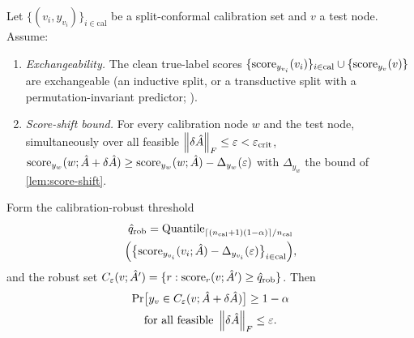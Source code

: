 \begin{theorem}
\label{thm:robust-cov}
Let $\{(v_i,y_{v_i})\}_{i\in\mathrm{cal}}$ be a split-conformal calibration set and $v$ a test node.
Assume:
\begin{enumerate}
\item[(C1)] \emph{Exchangeability.} The clean true-label scores
$\{\mathrm{score}_{y_{v_i}}(v_i)\}_{i\in\mathrm{cal}}\cup\{\mathrm{score}_{y_v}(v)\}$ are exchangeable (an inductive
split, or a transductive split with a permutation-invariant predictor; \citealp{zargarbashi2023conformal}).
\item[(C2)] \emph{Score-shift bound.} For every calibration node $w$ and the test node, simultaneously
over all feasible $\left\|\delta\hat{A}\right\|_F\le\varepsilon<\varepsilon_{\mathrm{crit}}$,
$\mathrm{score}_{y_w}(w;\hat{A}+\delta\hat{A})\ge\mathrm{score}_{y_w}(w;\hat{A})-\Delta_{y_w}(\varepsilon)$ with
$\Delta_{y_w}$ the bound of \cref{lem:score-shift}.
\end{enumerate}
Form the calibration-robust threshold
\begin{multline}
\hat q_{\mathrm{rob}}=\mathrm{Quantile}_{\lceil(n_{\mathrm{cal}}+1)(1-\alpha)\rceil/n_{\mathrm{cal}}}\\
\Big(\big\{\mathrm{score}_{y_{v_i}}(v_i;\hat{A})-\Delta_{y_{v_i}}(\varepsilon)\big\}_{i\in\mathrm{cal}}\Big),
\label{eq:qrob}
\end{multline}
and the robust set $C_\varepsilon(v;\hat{A}')=\{r:\mathrm{score}_r(v;\hat{A}')\ge\hat q_{\mathrm{rob}}\}$. Then
\begin{multline}
\Pr\!\big[y_v\in C_\varepsilon(v;\hat{A}+\delta\hat{A})\big]\ge1-\alpha\\
\text{for all feasible }\left\|\delta\hat{A}\right\|_F\le\varepsilon.
\label{eq:robcov}
\end{multline}
\end{theorem}


